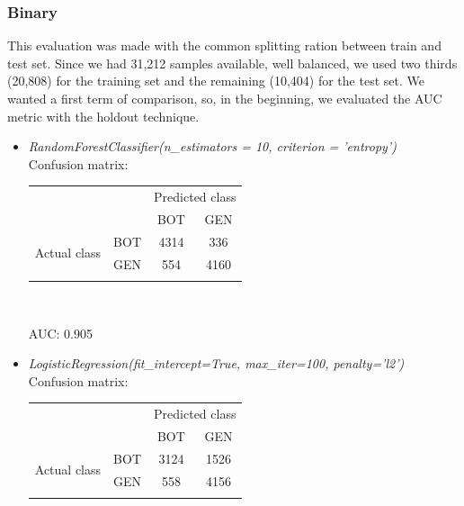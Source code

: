 \subsubsection{Binary}
This evaluation was made with the common splitting ration between train and test set. Since we had 31,212 samples available, well balanced, we used two thirds (20,808) for the training set and the remaining (10,404) for the test set.
We wanted a first term of comparison, so, in the beginning, we evaluated the AUC metric with the holdout technique.
\begin{itemize}
	\item[\PencilRight] \textit{RandomForestClassifier(n\_estimators = 10, criterion = 'entropy')}\\
	Confusion matrix:
	
	{
		\centering
		\begin{tabular}{@{}cc|cc@{}}
			\multicolumn{1}{c}{} &\multicolumn{1}{c}{} &\multicolumn{2}{c}{Predicted class} \\ 
			\multicolumn{1}{c}{} & 
			\multicolumn{1}{c|}{} & 
			\multicolumn{1}{c}{BOT} & 
			\multicolumn{1}{c}{GEN}  \\
			\cline{2-4}
			\multirow[c]{2}{*}{Actual class}
			& BOT  & 4314 & 336\\
			& GEN  & 554 & 4160\\
			\cline{2-4}\\
		\end{tabular}\\
	}
	
	AUC: 0.905
	
	\item[\PencilRight] \textit{LogisticRegression(fit\_intercept=True, max\_iter=100, penalty='l2')}\\
	Confusion matrix:
	
	{
		\centering
		\begin{tabular}{@{}cc|cc@{}}
			\multicolumn{1}{c}{} &\multicolumn{1}{c}{} &\multicolumn{2}{c}{Predicted class} \\ 
			\multicolumn{1}{c}{} & 
			\multicolumn{1}{c|}{} & 
			\multicolumn{1}{c}{BOT} & 
			\multicolumn{1}{c}{GEN}  \\
			\cline{2-4}
			\multirow[c]{2}{*}{Actual class}
			& BOT  & 3124 & 1526\\
			& GEN  & 558 & 4156\\
			\cline{2-4}\\
		\end{tabular}\\
	}
	

\end{itemize}
